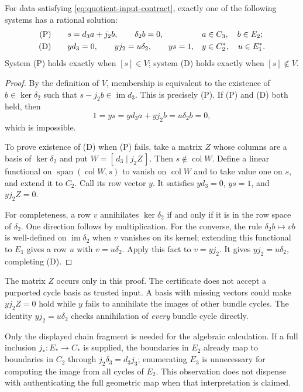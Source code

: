 \begin{theorem}
\label{thm:quotient-alternative}
For data satisfying \eqref{eq:quotient-input-contract}, exactly one of
the following systems has a rational solution:
\begin{align}
 \text{\rm(P)}\qquad&
 s=d_3a+j_2b,\qquad \delta_2b=0,
 &&a\in C_3,\quad b\in E_2; \label{eq:quotient-primal}\\
 \text{\rm(D)}\qquad&
 yd_3=0,\qquad yj_2=u\delta_2,\qquad ys=1,
 &&y\in C_2^*,\quad u\in E_1^* . \label{eq:quotient-dual}
\end{align}
System {\rm(P)} holds exactly when $[s]\in V$; system {\rm(D)} holds
exactly when $[s]\notin V$.
\end{theorem}

\begin{proof}
By the definition of $V$, membership is equivalent to the existence of
$b\in\ker\delta_2$ such that $s-j_2b\in\operatorname{im}d_3$.
This is precisely (P). If (P) and (D) both held, then
\[
 1=ys=yd_3a+yj_2b=u\delta_2b=0,
\]
which is impossible.

To prove existence of (D) when (P) fails, take a matrix $Z$ whose columns
are a basis of $\ker\delta_2$ and put $W=[\,d_3\mid j_2Z\,]$.
Then $s\notin\operatorname{col}W$. Define a linear functional on
$\operatorname{span}(\operatorname{col}W,s)$ to vanish on
$\operatorname{col}W$ and to take value one on $s$, and extend it to
$C_2$. Call its row vector $y$. It satisfies $yd_3=0$, $ys=1$, and
$yj_2Z=0$.

For completeness, a row $v$ annihilates $\ker\delta_2$ if and only if
it is in the row space of $\delta_2$. One direction follows by
multiplication. For the converse, the rule
$\delta_2b\mapsto vb$ is well-defined on $\operatorname{im}\delta_2$
when $v$ vanishes on its kernel; extending this functional to $E_1$
gives a row $u$ with $v=u\delta_2$. Apply this fact to $v=yj_2$.
It gives $yj_2=u\delta_2$, completing (D).
\end{proof}

The matrix $Z$ occurs only in this proof. The certificate does not accept
a purported cycle basis as trusted input. A basis with missing vectors
could make $yj_2Z=0$ hold while $y$ fails to annihilate the images of
other bundle cycles. The identity $yj_2=u\delta_2$ checks annihilation
of \emph{every} bundle cycle directly.

Only the displayed chain fragment is needed for the algebraic
calculation. If a full inclusion $j_*:E_*\to C_*$ is supplied, the
boundaries in $E_2$ already map to boundaries in $C_2$ through
$j_2\delta_3=d_3j_3$; enumerating $E_3$ is unnecessary for computing
the image from all cycles of $E_2$. This observation does not dispense
with authenticating the full geometric map when that interpretation is
claimed.

